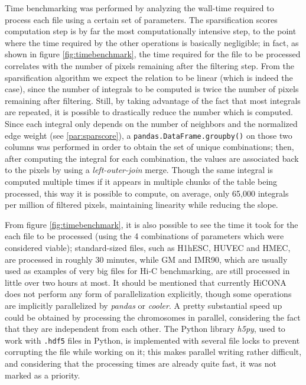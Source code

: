 Time benchmarking was performed by analyzing the wall-time required to process each file using a certain set of parameters. The sparsification scores computation step is by far the most computationally intensive step, to the point where the time required by the other operations is basically negligible; in fact, as shown in figure \ref{fig:timebenchmark}, the time required for the file to be processed correlates with the number of pixels remaining after the filtering step. From the sparsification algorithm we expect the relation to be linear (which is indeed the case), since the number of integrals to be computed is twice the number of pixels remaining after filtering. Still, by taking advantage of the fact that most integrals are repeated, it is possible to drastically reduce the number which is computed. Since each integral only depends on the number of neighbors and the normalized edge weight (see \ref{par:sparscore}), a \texttt{pandas.DataFrame.groupby()} on those two columns was performed in order to obtain the set of unique combinations; then, after computing the integral for each combination, the values are associated back to the pixels by using a \textit{left-outer-join} merge. Though the same integral is computed multiple times if it appears in multiple chunks of the table being processed, this way it is possible to compute, on average, only 65,000 integrals per million of filtered pixels, maintaining linearity while reducing the slope.

From figure \ref{fig:timebenchmark}, it is also possible to see the time it took for the each file to be processed (using the 4 combinations of parameters which were considered viable); standard-sized files, such as H1hESC, HUVEC and HMEC, are processed in roughly 30 minutes, while GM and IMR90, which are usually used as examples of very big files for Hi-C benchmarking, are still processed in little over two hours at most. It should be mentioned that currently HiCONA does not perform any form of parallelization explicitly, though some operations are implicitly parallelized by \textit{pandas} or \textit{cooler}. A pretty substantial speed up could be obtained by processing the chromosomes in parallel, considering the fact that they are independent from each other. The Python library \textit{h5py}, used to work with \texttt{.hdf5} files in Python, is implemented with several file locks to prevent corrupting the file while working on it; this makes parallel writing rather difficult, and considering that the processing times are already quite fast, it was not marked as a priority.

